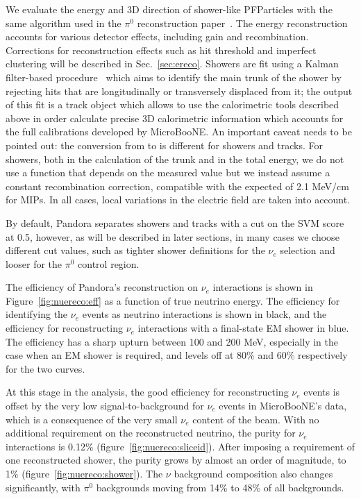 We evaluate the energy and 3D direction of shower-like PFParticles with the same algorithm used in the $\pi^0$ reconstruction paper~\cite{bib:pi0reco}. The energy reconstruction accounts for various detector effects, including gain and recombination. Corrections for reconstruction effects such as hit threshold and imperfect clustering will be described in Sec.~\ref{sec:ereco}. Showers are fit using a Kalman filter-based procedure~\cite{bib:shrtrackfitter} which aims to identify the main trunk of the shower by rejecting hits that are longitudinally or transversely displaced from it; the output of this fit is a track object which allows to use the calorimetric tools described above in order calculate precise 3D calorimetric information which accounts for the full calibrations developed by MicroBooNE. An important caveat needs to be pointed out: the conversion from \dqdx to \dedx is different for showers and tracks. For showers, both in the calculation of the trunk \dedx and in the total energy, we do not use a function that depends on the measured \dqdx value but we instead assume a constant recombination correction, compatible with the expected \dedx of 2.1 MeV/cm for MIPs. In all cases, local variations in the electric field are taken into account.

By default, Pandora separates showers and tracks with a cut on the SVM score at 0.5, however, as will be described in later sections, in many cases we choose different cut values, such as tighter shower definitions for the $\nu_e$ selection and looser for the $\pi^0$ control region.

The efficiency of Pandora's reconstruction on $\nu_e$ interactions is shown in Figure~\ref{fig:nuereco:eff} as a function of true neutrino energy. The efficiency for identifying the $\nu_e$ events as neutrino interactions is shown in black, and the efficiency for reconstructing $\nu_e$ interactions with a final-state EM shower in blue. The efficiency has a sharp upturn between 100 and 200 MeV, especially in the case when an EM shower is required, and levels off at 80\% and 60\% respectively for the two curves. 
\par At this stage in the analysis, the good efficiency for reconstructing $\nu_e$ events is offset by the very low signal-to-background for $\nu_e$ events in MicroBooNE's data, which is a consequence of the very small $\nu_e$ content of the beam. With no additional requirement on the reconstructed neutrino, the purity for $\nu_e$ interactions is 0.12\% (figure~\ref{fig:nuereco:sliceid}). After imposing a requirement of one reconstructed shower, the purity grows by almost an order of magnitude, to 1\% (figure~\ref{fig:nuereco:shower}). The $\nu$ background composition also changes significantly, with $\pi^0$ backgrounds moving from 14\% to 48\% of all backgrounds.


